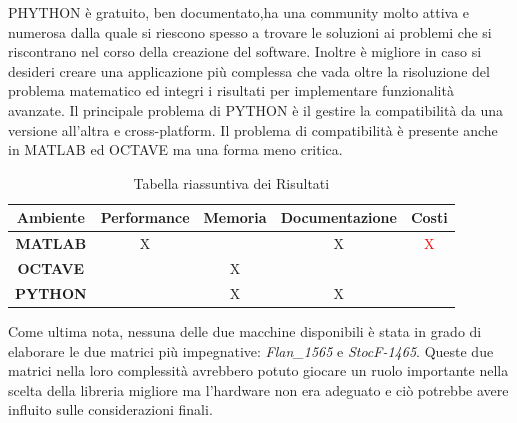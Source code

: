 \documentclass[a4paper,12pt,titlepage,oneside]{book}
\begin{document}
    PHYTHON è gratuito, ben documentato,ha una community molto attiva e numerosa dalla quale si riescono spesso a trovare le soluzioni ai problemi che si riscontrano nel corso della creazione del software. Inoltre è migliore in caso si desideri creare una applicazione più complessa che vada oltre la risoluzione del problema matematico ed integri i risultati per implementare funzionalità avanzate. Il principale problema di PYTHON è il gestire la compatibilità da una versione all'altra e cross-platform. Il problema di compatibilità è presente anche in MATLAB ed OCTAVE ma una forma meno critica.
    
    \begin{table}[h!]
    \centering
    \begin{tabular}{|| c || c c c c ||}
    \hline
    Ambiente & Performance & Memoria & Documentazione & Costi \\ [0.5ex]
    \hline
    \hline
    \textbf{MATLAB} & X &  & X & \textcolor{red}{X} \\
    \textbf{OCTAVE} &   & X &  &  \\
    \textbf{PYTHON} &  & X & X &  \\ [1ex]
    \hline
    \end{tabular}
    \caption{Tabella riassuntiva dei Risultati}
    \end{table}
    
    \noindent Come ultima nota, nessuna delle due macchine disponibili è stata in grado di elaborare le due matrici più impegnative: \textit{Flan\_1565} e \textit{StocF-1465}. Queste due matrici nella loro complessità avrebbero potuto giocare un ruolo importante nella scelta della libreria migliore ma l'hardware non era adeguato e ciò potrebbe avere influito sulle considerazioni finali.
    
\nocite{*}
\printbibliography
\end{document}
